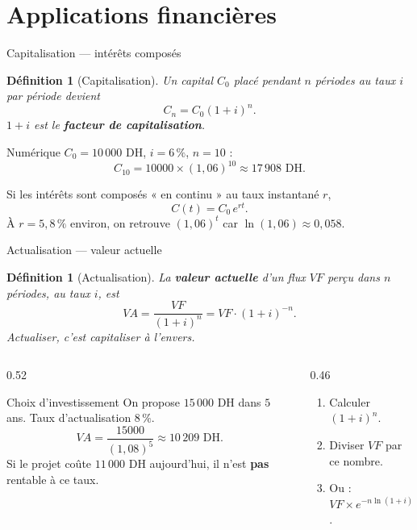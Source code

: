 \documentclass[10pt,aspectratio=169]{beamer}
\newcounter{dummy}
\numberwithin{dummy}{section}
\newtheorem{mydef}[dummy]{Définition}
\begin{document}
\section{Applications financières}

\begin{frame}{Capitalisation --- intérêts composés}
\begin{mydef}[Capitalisation]
Un capital $C_0$ placé pendant $n$ périodes au taux $i$ par période devient
\[
C_n=C_0(1+i)^n.
\]
$1+i$ est le \textbf{facteur de capitalisation}.
\end{mydef}

\begin{exampleblock}{Numérique}
$C_0=10\,000$ DH, $i=6\,\%$, $n=10$ :
\[
C_{10}=10000\times(1{,}06)^{10}\approx 17\,908\text{ DH}.
\]
\end{exampleblock}

\begin{boxgestion}
Si les intérêts sont composés « en continu » au taux instantané $r$,
\[
C(t)=C_0\,e^{rt}.
\]
À $r=5{,}8\,\%$ environ, on retrouve $(1{,}06)^t$ car $\ln(1{,}06)\approx 0{,}058$.
\end{boxgestion}
\end{frame}

\begin{frame}{Actualisation --- valeur actuelle}
\begin{mydef}[Actualisation]
La \textbf{valeur actuelle} d'un flux $VF$ perçu dans $n$ périodes, au taux $i$, est
\[
VA=\frac{VF}{(1+i)^n}=VF\cdot(1+i)^{-n}.
\]
Actualiser, c'est \emph{capitaliser à l'envers}.
\end{mydef}

\begin{columns}[T]
\begin{column}{0.52\textwidth}
\begin{exampleblock}{Choix d'investissement}
On propose $15\,000$ DH dans $5$ ans.
Taux d'actualisation $8\,\%$.
\[
VA=\frac{15000}{(1{,}08)^5}\approx 10\,209\text{ DH}.
\]
Si le projet coûte $11\,000$ DH aujourd'hui, il n'est \textbf{pas} rentable
à ce taux.
\end{exampleblock}
\end{column}
\begin{column}{0.46\textwidth}
\begin{boxmethode}[Calculatrice]
\begin{enumerate}
    \item Calculer $(1+i)^n$.
    \item Diviser $VF$ par ce nombre.
    \item Ou : $VF \times e^{-n\ln(1+i)}$.
\end{enumerate}
\end{boxmethode}
\end{column}
\end{columns}
\end{frame}
\end{document}

